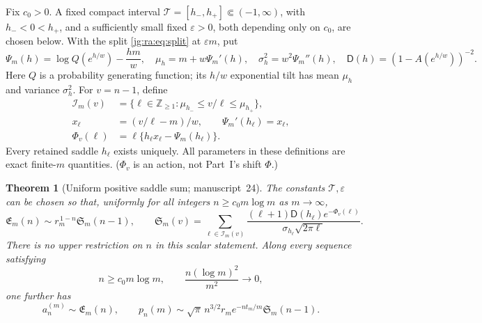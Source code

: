 \documentclass[11pt,a4paper]{article}
\newtheorem{theorem}{Theorem}[section]
\theoremstyle{definition}\newaliascnt{definition}{theorem}
\theoremstyle{remark}\newaliascnt{remark}{theorem}
\begin{document}
Fix $c_0>0$. A fixed compact interval
$\mathcal T=[h_-,h_+]\Subset(-1,\infty)$, with $h_-<0<h_+$, and a sufficiently
small fixed $\varepsilon>0$, both depending only on $c_0$, are chosen below.
With the split \eqref{jg:ra:eq:split} at $\varepsilon m$, put
\begin{equation}\label{jg:ss:eq:split}
 \Psi_m(h)=\log Q(e^{h/w})-\frac{hm}{w},\quad
 \mu_h=m+w\Psi_m'(h),\quad \sigma_h^2=w^2\Psi_m''(h),\quad
 \mathsf D(h)=(1-A(e^{h/w}))^{-2}.
\end{equation}
Here $Q$ is a probability generating function; its $h/w$ exponential tilt has
mean $\mu_h$ and variance $\sigma_h^2$. For $v=n-1$, define
\begin{equation}\label{jg:ss:eq:counts}
 \begin{split}
 \mathcal I_m(v)&=\{\ell\in\mathbb Z_{\ge1}:\mu_{h_-}\le v/\ell\le\mu_{h_+}\},\\
 x_\ell&=(v/\ell-m)/w,\qquad \Psi_m'(h_\ell)=x_\ell,\\
 \Phi_v(\ell)&=\ell\{h_\ell x_\ell-\Psi_m(h_\ell)\}.
 \end{split}
\end{equation}
Every retained saddle $h_\ell$ exists uniquely. All parameters in these
definitions are exact finite-$m$ quantities. ($\Phi_v$ is an action, not
Part~I's shift $\Phi$.)

\begin{theorem}[Uniform positive saddle sum; manuscript~24]\label{jg:ss:thm:main}
The constants $\mathcal T,\varepsilon$ can be chosen so that, uniformly for all
integers $n\ge c_0m\log m$ as $m\to\infty$,
\begin{equation}\label{jg:ss:eq:main}
 \mathfrak E_m(n)\sim r_m^{\,1-n}\mathfrak S_m(n-1),\qquad
 \mathfrak S_m(v)=
 \sum_{\ell\in\mathcal I_m(v)}
 \frac{(\ell+1)\mathsf D(h_\ell)e^{-\Phi_v(\ell)}}
      {\sigma_{h_\ell}\sqrt{2\pi\ell}}.
\end{equation}
There is no upper restriction on $n$ in this scalar statement. Along every
sequence satisfying
\begin{equation}\label{jg:ss:eq:actualband}
 n\ge c_0m\log m,\qquad \frac{n(\log m)^2}{m^2}\longrightarrow0,
\end{equation}
one further has
\begin{equation}\label{jg:ss:eq:actual}
 a_n^{(m)}\sim\mathfrak E_m(n),\qquad
 p_n(m)\sim\sqrt\pi\,n^{3/2}r_m e^{-nt_m/m}\mathfrak S_m(n-1).
\end{equation}
\end{theorem}
\end{document}
